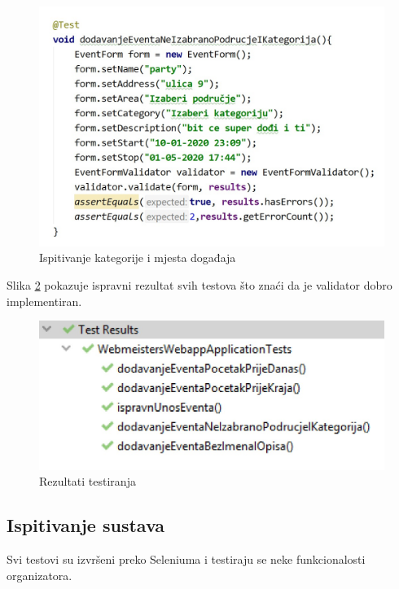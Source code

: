 \begin{figure}[H]
	\includegraphics[scale=0.4]{slike/kategorija_i_mjesto_dogadaja.jpeg}
	\centering
	\caption{Ispitivanje kategorije i mjesta događaja}
	\label{fig:kategorijaimjestodogadaja}
\end{figure}

\normalfont Slika \ref{fig:rezultatitestiranja} pokazuje ispravni rezultat svih testova što znaći da je validator dobro implementiran.

\begin{figure}[H]
	\includegraphics[scale=0.4]{slike/rezultati_testiranja.jpeg}
	\centering
	\caption{Rezultati testiranja}
	\label{fig:rezultatitestiranja}
\end{figure}

\bigskip

\subsection{Ispitivanje sustava}

\bigskip

\normalfont Svi testovi su izvršeni preko Seleniuma i testiraju se neke funkcionalosti organizatora.

